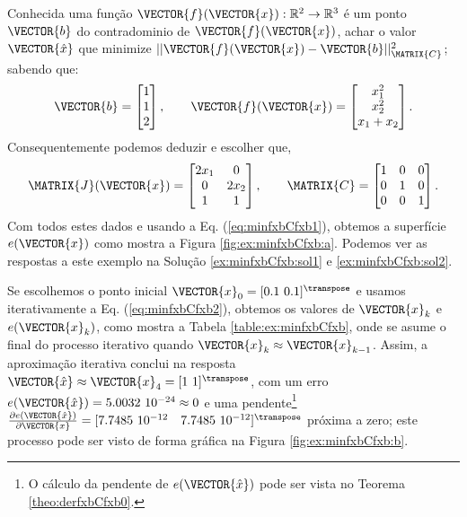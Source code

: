 \begin{example}
\label{ex:minfxbCfxb}
Conhecida uma função $\VECTOR{f}(\VECTOR{x}) : \mathbb{R}^{2} \rightarrow \mathbb{R}^{3}$
é um ponto $\VECTOR{b}$ do contradominio de $\VECTOR{f}(\VECTOR{x})$,
achar o valor $\VECTOR{\hat{x}}$ que minimize $||\VECTOR{f}(\VECTOR{x})-\VECTOR{b}||_{\MATRIX{C}}^2$;
sabendo que:
\begin{equation}
\VECTOR{b}=\begin{bmatrix}
1\\
1\\
2
\end{bmatrix},
\qquad 
\VECTOR{f}(\VECTOR{x})=\begin{bmatrix}
x_1^2\\
x_2^2\\
x_1+x_2
\end{bmatrix}.
\end{equation}
Consequentemente podemos deduzir e escolher que, 
\begin{equation}\label{eq:lab:ex2fx}
\MATRIX{J}(\VECTOR{x})=\begin{bmatrix}
2 x_1 & 0\\
0 & 2 x_2\\
1 & 1
\end{bmatrix},
\qquad
\MATRIX{C}=\begin{bmatrix}
1 & 0 & 0\\
0 & 1 & 0\\
0 & 0 & 1
\end{bmatrix}.
\end{equation}
Com todos estes dados e usando a Eq. (\ref{eq:minfxbCfxb1}),
obtemos a superfície $e(\VECTOR{x})$ como mostra a Figura \ref{fig:ex:minfxbCfxb:a}.
Podemos ver as respostas a este exemplo na Solução \ref{ex:minfxbCfxb:sol1} e \ref{ex:minfxbCfxb:sol2}.
\end{example}

\begin{SolutionT}
\label{ex:minfxbCfxb:sol1}
Se escolhemos o ponto inicial $\VECTOR{x}_0=[0.1~0.1]^{\transpose}$ e 
usamos iterativamente a Eq. (\ref{eq:minfxbCfxb2}), obtemos os valores 
de $\VECTOR{x}_k$ e $e(\VECTOR{x}_k)$, como mostra a Tabela \ref{table:ex:minfxbCfxb},
onde se asume o final do processo iterativo quando $\VECTOR{x}_k \approx \VECTOR{x}_{k-1}$.
Assim, a aproximação iterativa conclui na resposta $\VECTOR{\hat{x}}\approx \VECTOR{x}_{4} =[1~1]^{\transpose}$,
com um erro $e(\VECTOR{\hat{x}})=5.0032~10^{-24}\approx 0$ e uma pendente\footnote{\label{ref:pendenteex} O
cálculo da pendente de $e(\VECTOR{\hat{x}})$ pode ser vista no Teorema \ref{theo:derfxbCfxb0}.}
$\frac{\partial e(\VECTOR{\hat{x}})}{\partial \VECTOR{x} }=[7.7485~10^{-12}\quad 7.7485~10^{-12}]^{\transpose}$
próxima a zero;
este processo pode ser visto de forma gráfica na Figura \ref{fig:ex:minfxbCfxb:b}.
\end{SolutionT}


